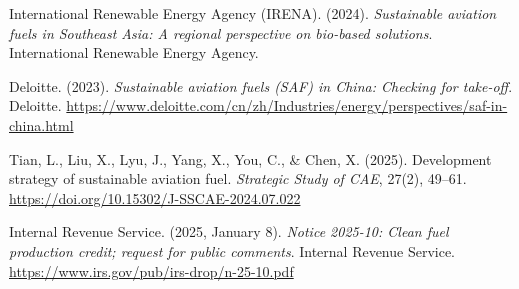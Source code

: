 \documentclass[a4paper,11pt]{article}
\begin{document}
\begin{thebibliography}{9}
International Renewable Energy Agency (IRENA). (2024). \textit{Sustainable aviation fuels in Southeast Asia: A regional perspective on bio-based solutions}. International Renewable Energy Agency.

Deloitte. (2023). \textit{Sustainable aviation fuels (SAF) in China: Checking for take-off}. Deloitte.
\url{https://www.deloitte.com/cn/zh/Industries/energy/perspectives/saf-in-china.html    }

Tian, L., Liu, X., Lyu, J., Yang, X., You, C., \& Chen, X. (2025). Development strategy of sustainable aviation fuel. \textit{Strategic Study of CAE}, 27(2), 49--61.
\url{https://doi.org/10.15302/J-SSCAE-2024.07.022    }

Internal Revenue Service. (2025, January 8). \textit{Notice 2025-10: Clean fuel production credit; request for public comments}. Internal Revenue Service.
\url{https://www.irs.gov/pub/irs-drop/n-25-10.pdf    }

\end{thebibliography}
\end{document}
